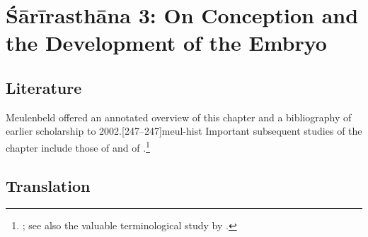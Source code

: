 
\chapter{Śārīrasthāna 3:  On Conception and the Development of the 
Embryo}


\section{Literature} 

Meulenbeld offered an annotated overview of this chapter and a
bibliography of earlier scholarship to
2002.[247--247]{meul-hist}  Important subsequent 
studies of the chapter include those of \citeauthor{das-2003} and of
\citeauthor{krit-2009}.\footnote{\cites[ch.\,8, et 
passim]{das-2003}{krit-2009,krit-2013}; 
see also the valuable terminological study by 
\citet{sune-1991}.}

\newpage
\section{Translation}


